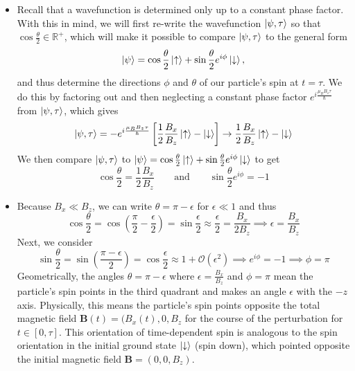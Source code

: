 \documentclass[11pt, a4paper]{article}
\newcommand{\eqtext}[1]{\qquad \text{#1} \qquad}
\renewcommand{\vec}[1]{\bm{#1}} %
\newcommand{\p}{\psi}  %
\newcommand{\ua}{\uparrow}  %
\newcommand{\da}{\downarrow}  %
\begin{document}
\begin{itemize}
	\item Recall that a wavefunction is determined only up to a constant phase factor. With this in mind, we will first re-write the wavefunction $ \ket{\p, \tau} $ so that $ \cos \frac{\theta}{2} \in \mathbb{R}^{+} $, which will make it possible to compare $ \ket{\p, \tau} $ to the general form
	\begin{equation*}
		\ket{\p} = \cos \frac{\theta}{2}\ket{\ua} + \sin \frac{\theta}{2}e^{i\phi}\ket{\da},
	\end{equation*}
	and thus determine the directions $ \phi $ and $ \theta $ of our particle's spin at $ t = \tau $. We do this by factoring out and then neglecting a constant phase factor $ e^{i\frac{\mu_{B}B_{z}\tau}{\hbar}} $ from $ \ket{\p, \tau} $, which gives
	\begin{equation*}
		\ket{\p, \tau} = - e^{i\frac{\mu_{B}B_{z}\tau}{\hbar}}\left[\frac{1}{2}\frac{B_{x}}{B_{z}}\ket{\ua} - \ket{\da}\right] \to \frac{1}{2}\frac{B_{x}}{B_{z}}\ket{\ua} - \ket{\da}
	\end{equation*}
	We then compare $ \ket{\p, \tau} $ to $ \ket{\p} = \cos \frac{\theta}{2}\ket{\ua} + \sin \frac{\theta}{2}e^{i\phi}\ket{\da} $ to get
	\begin{equation*}
		\cos \frac{\theta}{2} = \frac{1}{2}\frac{B_{x}}{B_{z}} \eqtext{and} \sin \frac{\theta}{2}e^{i\phi} = - 1
	\end{equation*}
	
	\item Because $ B_{x} \ll B_{z} $, we can write $ \theta = \pi - \epsilon $ for $ \epsilon \ll 1 $ and thus
	\begin{equation*}
		\cos \frac{\theta}{2} = \cos \left(\frac{\pi}{2} - \frac{\epsilon}{2}\right) = \sin \frac{\epsilon}{2} \approx \frac{\epsilon}{2} = \frac{B_{x}}{2B_{z}} \implies \epsilon = \frac{B_{x}}{B_{z}}
	\end{equation*}
	Next, we consider
	\begin{equation*}
		\sin \frac{\theta}{2} = \sin \left(\frac{\pi - \epsilon}{2}\right) = \cos \frac{\epsilon}{2} \approx 1 + \mathcal{O}(\epsilon^{2}) \implies e^{i\phi} = -1 \implies \phi = \pi
	\end{equation*} 
    Geometrically, the angles $ \theta = \pi - \epsilon $ where $ \epsilon = \frac{B_{x}}{B_{z}}  $ and $ \phi = \pi $ mean the particle's spin points in the third quadrant and makes an angle $ \epsilon $ with the $ -z $ axis. Physically, this means the particle's spin points opposite the total magnetic field $ \vec{B}(t) = (B_{x}(t), 0, B_{z} $ for the course of the perturbation for $ t \in [0, \tau] $. This orientation of time-dependent spin is analogous to the spin orientation in the initial ground state $ \ket{\da} $ (spin down), which pointed opposite the initial magnetic field $ \vec{B} = (0, 0, B_{z}) $.  

\end{itemize}
\end{document}
